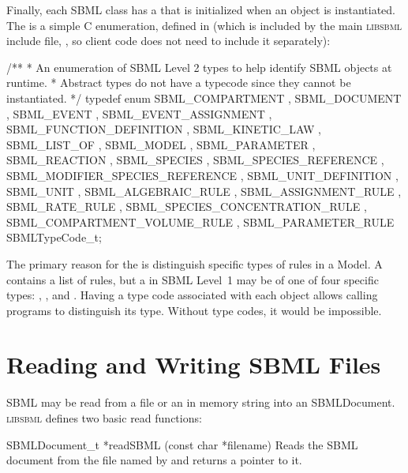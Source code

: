\documentclass{sbmlmanual}
\newcommand{\libsbml}{\textsc{libsbml}}
\begin{document}
Finally, each SBML class has a  that is initialized when
an object is instantiated.  The  is a simple C
enumeration, defined in  (which is included by the
main \libsbml{} include file, , so client code does not
need to include it separately):

\begin{example}[c]
/**
 * An enumeration of SBML Level 2 types to help identify SBML objects at runtime.
 * Abstract types do not have a typecode since they cannot be instantiated.
 */
typedef enum
{
    SBML_COMPARTMENT
  , SBML_DOCUMENT
  , SBML_EVENT
  , SBML_EVENT_ASSIGNMENT
  , SBML_FUNCTION_DEFINITION
  , SBML_KINETIC_LAW
  , SBML_LIST_OF
  , SBML_MODEL
  , SBML_PARAMETER
  , SBML_REACTION
  , SBML_SPECIES
  , SBML_SPECIES_REFERENCE
  , SBML_MODIFIER_SPECIES_REFERENCE
  , SBML_UNIT_DEFINITION
  , SBML_UNIT
  , SBML_ALGEBRAIC_RULE
  , SBML_ASSIGNMENT_RULE
  , SBML_RATE_RULE
  , SBML_SPECIES_CONCENTRATION_RULE
  , SBML_COMPARTMENT_VOLUME_RULE
  , SBML_PARAMETER_RULE
} SBMLTypeCode_t;
\end{example}

The primary reason for the  is distinguish specific
types of rules in a Model.  A  contains a list of rules,
but a  in SBML Level~1 may be of one of four specific types:
, ,
 and .  Having a type
code associated with each object allows calling programs to distinguish its
type.  Without type codes, it would be impossible.


\section{Reading and Writing SBML Files}
\label{sec:reading-sbml}

SBML may be read from a file or an in memory string into an
SBMLDocument.  \libsbml{} defines two basic read functions:

\begin{methoddef}{SBMLDocument\_t *readSBML (const char *filename)}
  Reads the SBML document from the file named by  and
  returns a pointer to it.
\end{methoddef}
\end{document}
